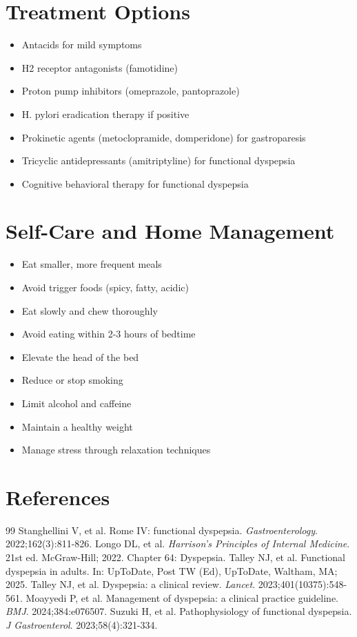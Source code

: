 \section*{Treatment Options}
\begin{itemize}
\item Antacids for mild symptoms
\item H2 receptor antagonists (famotidine)
\item Proton pump inhibitors (omeprazole, pantoprazole)
\item H. pylori eradication therapy if positive
\item Prokinetic agents (metoclopramide, domperidone) for gastroparesis
\item Tricyclic antidepressants (amitriptyline) for functional dyspepsia
\item Cognitive behavioral therapy for functional dyspepsia
\end{itemize}

\section*{Self-Care and Home Management}
\begin{itemize}
\item Eat smaller, more frequent meals
\item Avoid trigger foods (spicy, fatty, acidic)
\item Eat slowly and chew thoroughly
\item Avoid eating within 2-3 hours of bedtime
\item Elevate the head of the bed
\item Reduce or stop smoking
\item Limit alcohol and caffeine
\item Maintain a healthy weight
\item Manage stress through relaxation techniques
\end{itemize}

\section*{References}

\begin{thebibliography}{99}
 Stanghellini V, et al. Rome IV: functional dyspepsia. \emph{Gastroenterology}. 2022;162(3):811-826.
 Longo DL, et al. \emph{Harrison's Principles of Internal Medicine}. 21st ed. McGraw-Hill; 2022. Chapter 64: Dyspepsia.
 Talley NJ, et al. Functional dyspepsia in adults. In: UpToDate, Post TW (Ed), UpToDate, Waltham, MA; 2025.
 Talley NJ, et al. Dyspepsia: a clinical review. \emph{Lancet}. 2023;401(10375):548-561.
 Moayyedi P, et al. Management of dyspepsia: a clinical practice guideline. \emph{BMJ}. 2024;384:e076507.
 Suzuki H, et al. Pathophysiology of functional dyspepsia. \emph{J Gastroenterol}. 2023;58(4):321-334.
\end{thebibliography}
